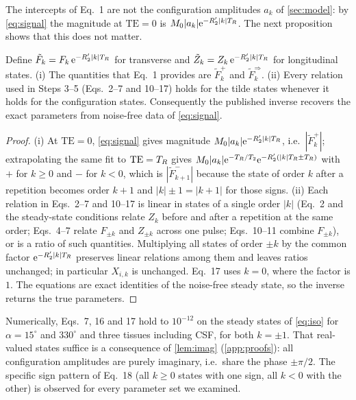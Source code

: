 The intercepts of Eq.~1 are not the configuration amplitudes $a_k$ of \cref{sec:model}: by
\eqref{eq:signal} the magnitude at $\mathrm{TE}=0$ is $M_0|a_k|\mathrm{e}^{-R_2'|k|T_R}$. The next
proposition shows that this does not matter.

\begin{proposition}\label{prop:paperconsistent}
Define $\tilde F_k=F_k\,\mathrm{e}^{-R_2'|k|T_R}$ for transverse and $\tilde Z_k=Z_k\,\mathrm{e}^{-R_2'|k|T_R}$
for longitudinal states. (i) The quantities that Eq.~1 provides are $\tilde F^+_k$ and
$\tilde F^\Rightarrow_k$. (ii) Every relation used in Steps 3--5 (Eqs.~2--7 and 10--17)
holds for the tilde states whenever it holds for the configuration states. Consequently the
published inverse recovers the exact parameters from noise-free data of \eqref{eq:signal}.
\end{proposition}
\begin{proof}
(i) At $\mathrm{TE}=0$, \eqref{eq:signal} gives magnitude $M_0|a_k|\mathrm{e}^{-R_2'|k|T_R}$,
i.e.\ $|\tilde F^+_k|$; extrapolating the same fit to $\mathrm{TE}=T_R$ gives
$M_0|a_k|\mathrm{e}^{-T_R/T_2}\mathrm{e}^{-R_2'(|k|T_R\pm T_R)}$ with $+$ for $k\ge0$ and $-$ for $k<0$, which
is $|\tilde F_{k+1}^-|$ because the state of order $k$ after a repetition becomes order $k+1$
and $|k|\pm1=|k+1|$ for those signs. (ii) Each relation in Eqs.~2--7 and 10--17 is linear in
states of a single order $|k|$ (Eq.~2 and the steady-state conditions relate $Z_k$ before and
after a repetition at the same order; Eqs.~4--7 relate $F_{\pm k}$ and $Z_{\pm k}$ across one
pulse; Eqs.~10--11 combine $F_{\pm k}$), or is a ratio of such quantities. Multiplying all
states of order $\pm k$ by the common factor $\mathrm{e}^{-R_2'|k|T_R}$ preserves linear relations among
them and leaves ratios unchanged; in particular $X_{i,k}$ is unchanged. Eq.~17 uses $k=0$,
where the factor is $1$. The equations are exact identities of the noise-free steady state,
so the inverse returns the true parameters.
\end{proof}

Numerically, Eqs.~7, 16 and 17 hold to $10^{-12}$ on the steady states of \eqref{eq:iso} for
$\alpha=15^\circ$ and $330^\circ$ and three tissues including CSF, for both $k=\pm1$. That real-valued
states suffice is a consequence of \cref{lem:imag} (\cref{app:proofs}): all configuration
amplitudes are purely imaginary, i.e.\ share the phase $\pm\pi/2$. The specific sign pattern of
Eq.~18 (all $k\ge0$ states with one sign, all $k<0$ with the other) is observed for every
parameter set we examined.

